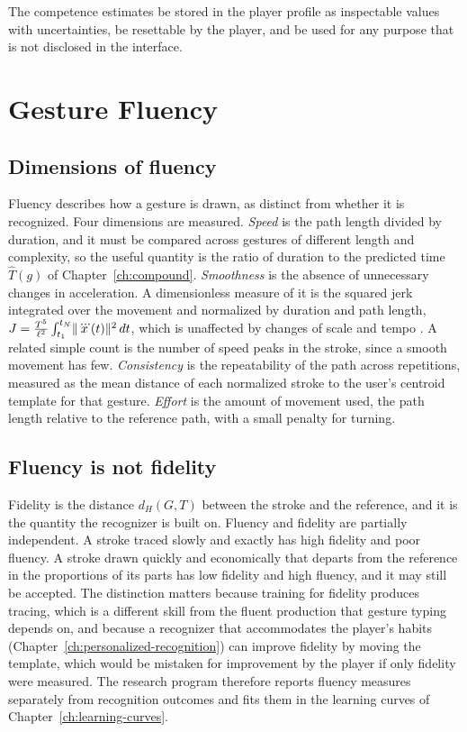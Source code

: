 \begin{requirement}\label{req:transparent-estimates}
The competence estimates \must{} be stored in the player profile as inspectable values with uncertainties, \must{} be resettable by the player, and \mustnot{} be used for any purpose that is not disclosed in the interface.\evS
\end{requirement}

\chapter{Gesture Fluency}\label{ch:fluency}

\section{Dimensions of fluency}

Fluency describes how a gesture is drawn, as distinct from whether it is recognized. Four dimensions are measured. \emph{Speed} is the path length divided by duration, and it must be compared across gestures of different length and complexity, so the useful quantity is the ratio of duration to the predicted time $\hat T(g)$ of Chapter~\ref{ch:compound}. \emph{Smoothness} is the absence of unnecessary changes in acceleration. A dimensionless measure of it is the squared jerk integrated over the movement and normalized by duration and path length, $J=\frac{T^{5}}{\ell^{2}}\int_{t_1}^{t_N}\lVert \dddot{x}(t)\rVert^{2}\,dt$, which is unaffected by changes of scale and tempo \cite{hogan2009}.\evD{} A related simple count is the number of speed peaks in the stroke, since a smooth movement has few. \emph{Consistency} is the repeatability of the path across repetitions, measured as the mean distance of each normalized stroke to the user's centroid template for that gesture. \emph{Effort} is the amount of movement used, the path length relative to the reference path, with a small penalty for turning.

\section{Fluency is not fidelity}

Fidelity is the distance $d_H(G,T)$ between the stroke and the reference, and it is the quantity the recognizer is built on. Fluency and fidelity are partially independent. A stroke traced slowly and exactly has high fidelity and poor fluency. A stroke drawn quickly and economically that departs from the reference in the proportions of its parts has low fidelity and high fluency, and it may still be accepted. The distinction matters because training for fidelity produces tracing, which is a different skill from the fluent production that gesture typing depends on, and because a recognizer that accommodates the player's habits (Chapter~\ref{ch:personalized-recognition}) can improve fidelity by moving the template, which would be mistaken for improvement by the player if only fidelity were measured. The research program therefore reports fluency measures separately from recognition outcomes and fits them in the learning curves of Chapter~\ref{ch:learning-curves}.

